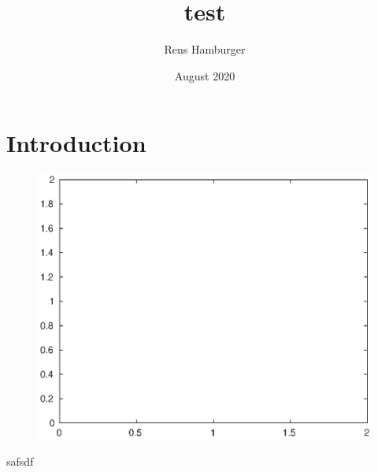 \documentclass{article}
\title{test}
\author{Rens Hamburger}
\date{August 2020}
\begin{document}
\maketitle

\section{Introduction}

\begin{figure}
	\centering
	\includegraphics[width=0.6\linewidth,keepaspectratio]{figures/empty.eps}
\end{figure}
safsdf
\end{document}
